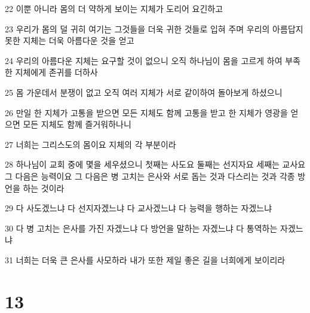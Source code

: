 \par 22 이뿐 아니라 몸의 더 약하게 보이는 지체가 도리어 요긴하고
\par 23 우리가 몸의 덜 귀히 여기는 그것들을 더욱 귀한 것들로 입혀 주며 우리의 아름답지 못한 지체는 더욱 아름다운 것을 얻고
\par 24 우리의 아름다운 지체는 요구할 것이 없으니 오직 하나님이 몸을 고르게 하여 부족한 지체에게 존귀를 더하사
\par 25 몸 가운데서 분쟁이 없고 오직 여러 지체가 서로 같이하여 돌아보게 하셨으니
\par 26 만일 한 지체가 고통을 받으면 모든 지체도 함께 고통을 받고 한 지체가 영광을 얻으면 모든 지체도 함께 즐거워하나니
\par 27 너희는 그리스도의 몸이요 지체의 각 부분이라
\par 28 하나님이 교회 중에 몇을 세우셨으니 첫째는 사도요 둘째는 선지자요 세째는 교사요 그 다음은 능력이요 그 다음은 병 고치는 은사와 서로 돕는 것과 다스리는 것과 각종 방언을 하는 것이라
\par 29 다 사도겠느냐 다 선지자겠느냐 다 교사겠느냐 다 능력을 행하는 자겠느냐
\par 30 다 병 고치는 은사를 가진 자겠느냐 다 방언을 말하는 자겠느냐 다 통역하는 자겠느냐
\par 31 너희는 더욱 큰 은사를 사모하라 내가 또한 제일 좋은 길을 너희에게 보이리라

\chapter{13}

